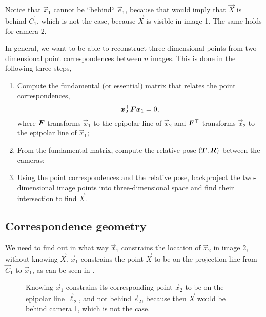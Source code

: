 Notice that $\vec{x}_1$ cannot be ``behind`` $\vec{e}_1$, because that would
imply that $\vec{X}$ is behind $\vec{C}_1$, which is not the case, because
$\vec{X}$ is visible in image 1. The same holds for camera 2.

In general, we want to be able to reconstruct three-dimensional points from
two-dimensional point correspondences between $n$ images. This is done in the
following three steps,
\begin{enumerate}
  \item Compute the fundamental (or essential) matrix that relates the point
    correspondences, \[
      \bm{x}_2^\top \bm{F} \bm{x}_1 = 0
    ,\]
    where $\bm{F}$ transforms $\vec{x}_1$ to the epipolar line of $\vec{x}_2$
    and $\bm{F}^\top$ transforms $\vec{x}_2$ to the epipolar line of
    $\vec{x}_1$;

  \item From the fundamental matrix, compute the relative pose
    $(\bm{T},\bm{R})$ between the cameras;

  \item Using the point correspondences and the relative pose, backproject the
    two-dimensional image points into three-dimensional space and find their
    intersection to find $\vec{X}$.

\end{enumerate}

\subsection{Correspondence geometry}

We need to find out in what way $\vec{x}_1$ constrains the location of
$\vec{x}_2$ in image 2, without knowing $\vec{X}$. $\vec{x}_1$ constrains the
point $\vec{X}$ to be on the projection line from $\vec{C}_1$ to $\vec{x}_1$,
as can be seen in .

\begin{figure}[ht]
    \centering
    \caption{Knowing $\vec{x}_1$ constrains its corresponding point $\vec{x}_2$
    to be on the epipolar line $\vec{\ell}_2$, and not behind $\vec{e}_2$,
    because then $\vec{X}$ would be behind camera 1, which is not the case.}
    \label{fig:image-1-constraint}
\end{figure}

